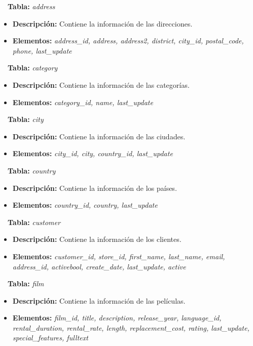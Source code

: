 \documentclass{report}
\begin{document}
\CIRCLE \ \ \textbf{Tabla:} \emph{address}
\begin{itemize}
  \item \textbf{Descripción:} Contiene la información de las direcciones.
  \item \textbf{Elementos:} \emph{address\_id, address, address2, district, city\_id, postal\_code, phone, last\_update}
\end{itemize}

\CIRCLE \ \ \textbf{Tabla:} \emph{category}
\begin{itemize}
  \item \textbf{Descripción:} Contiene la información de las categorías.
  \item \textbf{Elementos:} \emph{category\_id, name, last\_update}
\end{itemize}

\CIRCLE \ \ \textbf{Tabla:} \emph{city}
\begin{itemize}
  \item \textbf{Descripción:} Contiene la información de las ciudades.
  \item \textbf{Elementos:} \emph{city\_id, city, country\_id, last\_update}
\end{itemize}

\CIRCLE \ \ \textbf{Tabla:} \emph{country}
\begin{itemize}
  \item \textbf{Descripción:} Contiene la información de los países.
  \item \textbf{Elementos:} \emph{country\_id, country, last\_update}
\end{itemize}

\CIRCLE \ \ \textbf{Tabla:} \emph{customer}
\begin{itemize}
  \item \textbf{Descripción:} Contiene la información de los clientes.
  \item \textbf{Elementos:} \emph{customer\_id, store\_id, first\_name, last\_name, email, address\_id, activebool, create\_date, last\_update, active}
\end{itemize}

\CIRCLE \ \ \textbf{Tabla:} \emph{film}
\begin{itemize}
  \item \textbf{Descripción:} Contiene la información de las películas.
  \item \textbf{Elementos:} \emph{film\_id, title, description, release\_year, language\_id, rental\_duration, rental\_rate, length, replacement\_cost, rating, last\_update, special\_features, fulltext}
\end{itemize}
\end{document}
